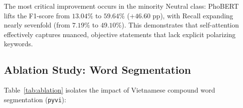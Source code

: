 \documentclass[conference]{IEEEtran}
\begin{document}
\begin{table}[!t]
\caption{Detailed Per-Class Performance Comparison on Seed 42}
\label{tab:per_class}
\centering
{}
\end{table}

\noindent The most critical improvement occurs in the minority Neutral class: PhoBERT lifts the F1-score from $13.04\%$ to $59.64\%$ ($+46.60\text{ pp}$), with Recall expanding nearly sevenfold (from $7.19\%$ to $49.10\%$). This demonstrates that self-attention effectively captures nuanced, objective statements that lack explicit polarizing keywords.

\subsection{Ablation Study: Word Segmentation}
Table~\ref{tab:ablation} isolates the impact of Vietnamese compound word segmentation (\texttt{pyvi}):

\begin{table}[!htbp]
\caption{Ablation Study on Vietnamese Word Segmentation (Seed 42, 1 run)}
\label{tab:ablation}
\centering
{}
\end{table}
\end{document}
